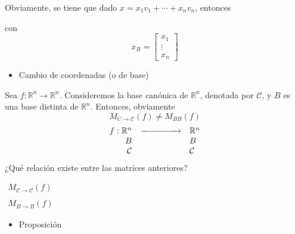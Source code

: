 \documentclass[12pt]{article}
\begin{document}
Obviamente, se tiene que dado $x=x_1v_1+\cdots+x_nv_n$, entonces \begin{center}
\end{center} con \[x_B=\begin{bmatrix}
x_1\\
\vdots\\
x_n
\end{bmatrix}\]
\begin{itemize}[label=\color{red}\textbullet, leftmargin=*]
    \item \color{lightblue} Cambio de coordenadas (o de base)
\end{itemize}
Sea $f:\mathbb{R}^n\longrightarrow\mathbb{R}^n$. Consideremos la base canónica de $\mathbb{R}^n$, denotada por $\mathcal{C}$, y $B$ es una base distinta de $\mathbb{R}^n$. Entonces, obviamente
\[M_{C\rightarrow\mathcal{C}}(f)\neq M_{BB}(f)\]
\[\begin{array}{rcl}
f: \mathbb{R}^n & \xrightarrow{\hspace{1.5cm}} & \mathbb{R}^n\\
B & & B\\
\mathcal{C} & & \mathcal{C}
\end{array}\]
¿Qué relación existe entre las matrices anteriores?
\begin{center}
\hspace{2cm}
$\begin{array}{l}
M_{\mathcal{C}\rightarrow\mathcal{C}}(f)\\
\\
M_{B\rightarrow B}(f)
\end{array}$
\end{center}
\begin{itemize}[label=\color{red}\textbullet, leftmargin=*]
    \item \color{lightblue} Proposición
\end{itemize}
\end{document}

